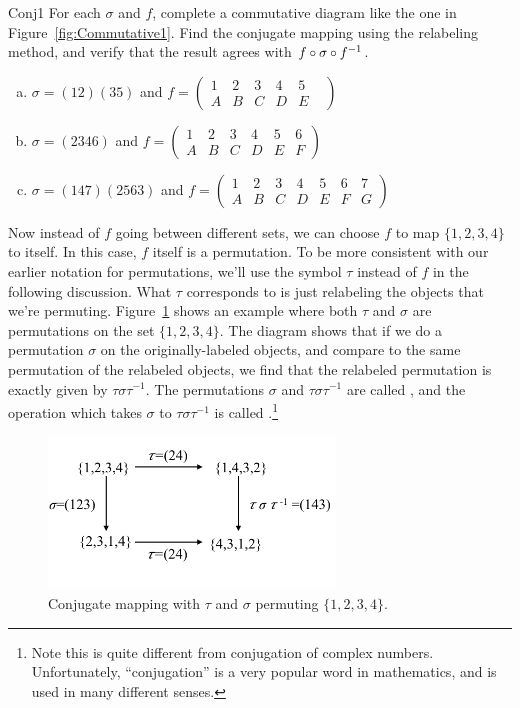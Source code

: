 \begin{exercise}{Conj1}
For each $\sigma$ and $f$, complete a commutative diagram like the one in Figure~\ref{fig:Commutative1}. Find the conjugate mapping using the relabeling method, and verify that the result agrees with $f \circ \sigma \circ f^{-1}$.
\begin{enumerate}[(a)]
\item $\sigma=(12)(35)$ and $f=\begin{pmatrix} 1&2&3&4&5\\ A&B&C&D&E& \end{pmatrix} $
\item $\sigma=(2346)$ and $f=\begin{pmatrix} 1&2&3&4&5&6\\ A&B&C&D&E&F \end{pmatrix}$
\item $\sigma=(147)(2563)$ and $f=\begin{pmatrix} 1&2&3&4&5&6&7\\ A&B&C&D&E&F&G \end{pmatrix}$
\end{enumerate}
\end {exercise}
Now instead of $f$ going between different sets, we can choose $f$ to map $\{1,2,3,4\}$ to itself. In this case, $f$ itself is a permutation.  To be more consistent with our earlier notation for permutations, we'll use the symbol $\tau$ instead of $f$ in the following discussion.  What $\tau$ corresponds to is just relabeling the objects that we're permuting. Figure~\ref{fig:Commutative2} shows an example where both $\tau$ and $\sigma$ are permutations on the set $\{1,2,3,4\}$. The diagram shows that if we do a permutation $\sigma$ on the originally-labeled objects, and compare to the same permutation of the relabeled objects, we find that the relabeled permutation is exactly given by $\tau\sigma \tau^{-1}$. The permutations $\sigma$ and $\tau\sigma \tau^{-1}$ are called , and the operation which takes $\sigma$ to $\tau \sigma \tau^{-1}$ is called .\footnote{Note this is quite different from conjugation of complex numbers. Unfortunately, ``conjugation'' is a very popular word in mathematics, and is used in many different senses.}

\begin{figure}[ht]
\begin{center}
\includegraphics[width=3in]{images/Commutative2.png}
\caption{Conjugate mapping with $\tau$ and $\sigma$ permuting $\{1,2,3,4\}$.}\label{fig:Commutative2}
\end{center}
\end{figure}

